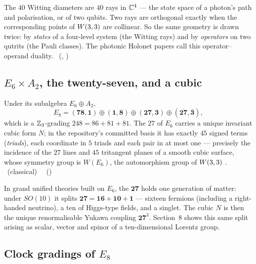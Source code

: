 \begin{physical}
The $40$ Witting diameters are $40$ rays in $\mathbb{C}^4$ --- the state space of a photon's path
and polarisation, or of two qubits. Two rays are orthogonal exactly when the corresponding
points of $W(3,3)$ are collinear. So the same geometry is drawn twice: by \emph{states} of a
four-level system (the Witting rays) and by \emph{operators} on two qutrits (the Pauli
classes). The photonic Holonet papers call this operator--operand duality.
\tierC\ (, )
\end{physical}

\subsection{\texorpdfstring{$E_6\times A_2$}{E6 x A2}, the twenty-seven, and a cubic}

Under its subalgebra $E_6\oplus A_2$,
\[
E_8=(\mathbf{78},\mathbf1)\oplus(\mathbf1,\mathbf8)\oplus(\mathbf{27},\mathbf3)\oplus(\overline{\mathbf{27}},\overline{\mathbf3}),
\]
which is a $\mathbb{Z}_3$-grading $248=86+81+81$. The $27$ of $E_6$ carries a unique invariant
cubic form $N$; in the repository's committed basis it has exactly $45$ signed terms
(\emph{triads}), each coordinate in $5$ triads and each pair in at most one ---
precisely the incidence of the $27$ lines and $45$ tritangent planes of a smooth cubic
surface, whose symmetry group is $W(E_6)$, the automorphism group of $W(3,3)$ \cite{Garibaldi}.
\tierT\ (classical) \ \tierC\ ()

\begin{physical}
In grand unified theories built on $E_6$, the $\mathbf{27}$ holds one generation of
matter: under $SO(10)$ it splits $\mathbf{27}=\mathbf{16}+\mathbf{10}+\mathbf1$ ---
sixteen fermions (including a right-handed neutrino), a ten of Higgs-type fields, and a
singlet. The cubic $N$ is then the unique renormalisable Yukawa coupling
$\mathbf{27}^3$. Section~8 shows this same split arising as scalar, vector and spinor of a
ten-dimensional Lorentz group.
\end{physical}

\subsection{Clock gradings of \texorpdfstring{$E_8$}{E8}}

